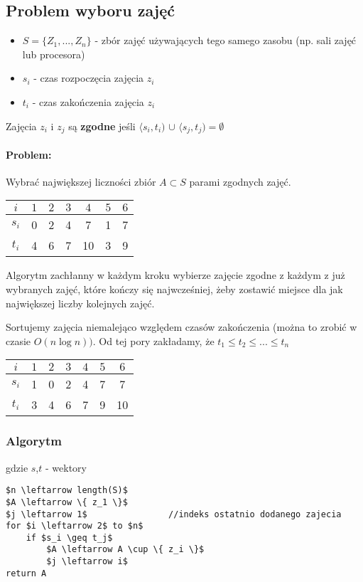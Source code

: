 \subsection{Problem wyboru zajęć}
\begin{itemize}
\item $S = \{ Z_1,...,Z_n \}$ - zbór zajęć używających tego samego zasobu (np. sali zajęć lub procesora) 
\item $s_i$ - czas rozpoczęcia zajęcia $z_i$
\item $t_i$ - czas zakończenia zajęcia $z_i$
\end{itemize}
Zajęcia $z_i$ i $z_j$ są \textbf{zgodne} jeśli $\langle s_i,t_i)$ $\cup$ $\langle s_j,t_j) = \emptyset$
\paragraph{Problem:}{ Wybrać największej liczności zbiór $A \subset S$ parami zgodnych zajęć.}
\begin{center}
\begin{tabular}{ c | c | c | c | c | c | c }
  $i$ & $1$	& $2$ & $3$ & $4$ & $5$ & $6$ \\ \hline
  $s_i$ & 0	&  2  & 4 	& 7 & 1 & 7 \\ \hline
  $t_i$ & 4	&  6  & 7 	& 10 & 3 & 9 \\  
\end{tabular}
\end{center}

Algorytm zachłanny w każdym kroku wybierze zajęcie zgodne z każdym z już wybranych zajęć, które kończy się najwcześniej, żeby zostawić miejsce dla jak największej liczby kolejnych zajęć.

Sortujemy zajęcia niemalejąco względem czasów zakończenia (można to zrobić w czasie $O(n \log n))$. Od tej pory zakładamy, że $t_1 \leq t_2 \leq ... \leq t_n$

\begin{center}
\begin{tabular}{ c | c | c | c | c | c | c }
  $i$ & $1$	& $2$ & $3$ & $4$ & $5$ & $6$ \\ \hline
  $s_i$ & 1	&  0  &  2	&  4  &  7  & 7 \\ \hline
  $t_i$ & 3	&  4  &  6	&  7  &  9  & 10 \\  
\end{tabular}
\end{center}

\subsubsection{Algorytm}
gdzie $s$,$t$ - wektory
\begin{lstlisting}
$n \leftarrow length(S)$
$A \leftarrow \{ z_1 \}$
$j \leftarrow 1$				//indeks ostatnio dodanego zajecia
for $i \leftarrow 2$ to $n$
	if $s_i \geq t_j$ 
    	$A \leftarrow A \cup \{ z_i \}$
    	$j \leftarrow i$
return A
\end{lstlisting}

